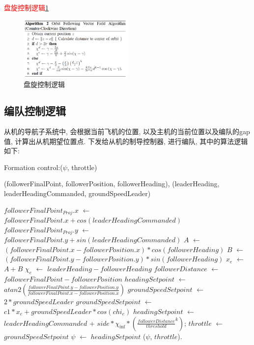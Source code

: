             \textcolor{red}{盘旋控制逻辑\ref{alg:loiter}}
            \begin{figure}[htpb]
                \centering
                \includegraphics[width=0.5\textwidth]{pictures/algorithm/loiter.png}
                \caption{盘旋控制逻辑}
                \label{alg:loiter}
            \end{figure}
            \clearpage
        \subsection{编队控制逻辑}
        从机的导航子系统中, 会根据当前飞机的位置, 以及主机的当前位置以及编队的gap值, 计算出从机期望位置点. 下发给从机的制导控制器, 进行编队, 其中的算法逻辑如下: 
        \begin{algorithm}[htpb]
            \caption{Formation control:($\psi$, throttle)}
            \begin{algorithmic}[1]
                \ENSURE (followerFinalPoint, followerPosition, followerHeading), (leaderHeading, leaderHeadingCommanded, groundSpeedLeader)
                
                \STATE $followerFinalPoint_{Proj}.x$ $\gets$ $followerFinalPoint.x + cos(leaderHeadingCommanded)$
                \STATE $followerFinalPoint_{Proj}.y$ $\gets$ $followerFinalPoint.y + sin(leaderHeadingCommanded)$
                \STATE $A$ $\gets$ $(followerFinalPoint.x - followerPosition.x) * cos(followerHeading)$
                \STATE $B$ $\gets$ $(followerFinalPoint.y - followerPosition.y) * sin(followerHeading)$
                \STATE $x_{e}$ $\gets$ $A + B$
                \STATE $\chi_e$ $\gets$ $leaderHeading - followerHeading$
                \STATE $followerDistance$ $\gets$ $followerFinalPoint - followerPosition$
                    \STATE $headingSetpoint$ $\gets$ $atan2(\frac{followerFinalPoint.y - followerPosition.y}{ followerFinalPoint.x - followerPosition.x})$
                    \STATE $groundSpeedSetpoint$ $\gets$ $2*groundSpeedLeader$
                    \STATE $groundSpeedSetpoint$ $\gets$ $c1 * x_e + groundSpeedLeader * cos(chi_e)$
                    \STATE $headingSetpoint$ $\gets$ $leaderHeadingCommanded$ + $side*\chi_{\inf}*(\frac{followerDistance}{threshold}^{k})$; 
                \ENDIF
                \STATE $throttle$ $\gets$ $groundSpeedSetpoint$
                \STATE $\psi$ $\gets$ $headingSetpoint$
                \RETURN ($\psi$, $throttle$).  %
            \end{algorithmic}
        \end{algorithm}

